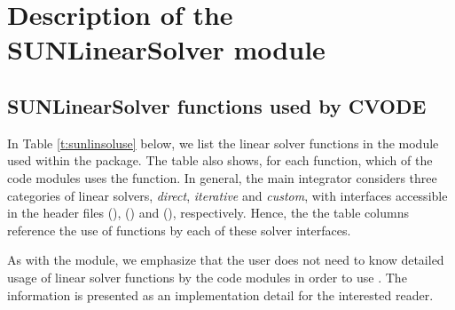 \chapter{Description of the SUNLinearSolver module}\label{s:sunlinsol}



\section{SUNLinearSolver functions used by CVODE}

In Table \ref{t:sunlinsoluse} below, we list the linear solver
functions in the {\sunlinsol} module used within the {\cvode} package.
The table also shows, for each function, which of the code modules uses
the function.  In general, the main {\cvode} integrator considers
three categories of linear solvers, \emph{direct}, \emph{iterative}
and \emph{custom}, with interfaces accessible in the {\cvode} header
files  ({\cvdls}), 
({\cvspils}) and  ({\cvcls}), respectively.
Hence, the the table columns reference the use of {\sunlinsol}
functions by each of these solver interfaces.

As with the {\sunmatrix} module, we emphasize that the {\cvode} user
does not need to know detailed usage of linear solver functions by the
{\cvode} code modules in order to use {\cvode}. The information is
presented as an implementation detail for the interested reader.

